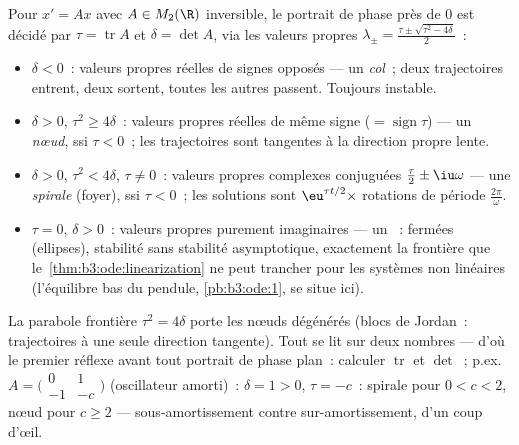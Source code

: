 \begin{example}
\label{ex:b3:ode:planeclassification}
Pour $x' = Ax$ avec $A \in M_2(\R)$ inversible, le portrait
de phase près de $0$ est décidé par $\tau =
\operatorname{tr}A$ et $\delta = \det A$, via les valeurs
propres $\lambda_\pm = \frac{\tau \pm \sqrt{\tau^2 -
4\delta}}2$~:
\begin{itemize}
  \item $\delta < 0$~: valeurs propres réelles de signes
        opposés --- un \emph{col}~; deux trajectoires
        entrent, deux sortent, toutes les autres passent. Toujours
        instable.
  \item $\delta > 0$, $\tau^2 \geq 4\delta$~: valeurs propres
        réelles de même signe ($= \operatorname{sign}\tau$)
        --- un \emph{nœud},  ssi $\tau < 0$~; les
        trajectoires sont tangentes à la direction propre
        lente.
  \item $\delta > 0$, $\tau^2 < 4\delta$, $\tau \neq 0$~:
        valeurs propres complexes conjuguées $\frac\tau2 \pm
        \iu\omega$ --- une \emph{spirale} (foyer),  ssi
        $\tau < 0$~; les solutions sont
        $\eu^{\tau t/2}\times$ rotations de période
        $\frac{2\pi}\omega$.
  \item $\tau = 0$, $\delta > 0$~: valeurs propres purement
        imaginaires --- un \emph{}~:  fermées
        (ellipses), stabilité sans stabilité asymptotique,
        exactement la frontière que
        le~\cref{thm:b3:ode:linearization} ne peut trancher
        pour les systèmes non linéaires (l'équilibre bas du
        pendule, \cref{pb:b3:ode:1}, se situe ici).
\end{itemize}
La parabole frontière $\tau^2 = 4\delta$ porte les nœuds
dégénérés (blocs de Jordan~: trajectoires à une seule
direction tangente). Tout se lit sur deux nombres --- d'où le
premier réflexe avant tout portrait de phase plan~: calculer
$\operatorname{tr}$ et $\det$~; p.ex.\
$A = \bigl(\begin{smallmatrix}0 & 1\\ -1 &
-c\end{smallmatrix}\bigr)$ (oscillateur amorti)~: $\delta = 1 >
0$, $\tau = -c$~: spirale  pour $0 < c < 2$, nœud
\omterm{def:b3:ode:stability}{stable} pour $c \geq 2$ --- sous-amortissement contre
sur-amortissement, d'un coup d'œil.
\end{example}


